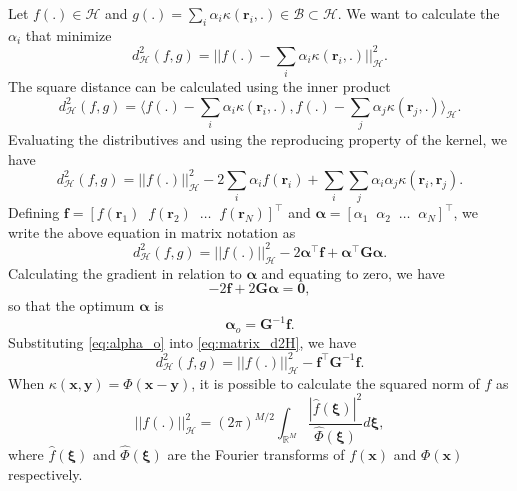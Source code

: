 Let $f(.) \in \mathcal{H}$ and $g(.) = \sum_{i}\alpha_i \kappa(\mathbf{r}_i,.) \in \mathcal{B} \subset \mathcal{H}$. We want to calculate the $\alpha_i$ that minimize
\begin{equation}
    d^2_\mathcal{H}(f,g) = ||f(.) - \sum_{i}\alpha_i \kappa(\mathbf{r}_i,.)||^2_{\mathcal{H}}.
\end{equation}
The square distance can be calculated using the inner product
\begin{equation}
    d^2_\mathcal{H}(f,g) = \langle f(.) - \sum_{i}\alpha_i \kappa(\mathbf{r}_i,.), f(.) - \sum_{j}\alpha_j \kappa(\mathbf{r}_j,.) \rangle_{\mathcal{H}}.
\end{equation}
Evaluating the distributives and using the reproducing property of the kernel, we have
\begin{equation}
    d^2_\mathcal{H}(f,g) = ||f(.)||^2_\mathcal{H} - 2\sum_{i}\alpha_i f(\mathbf{r}_i)   +\sum_i\sum_{j}\alpha_i\alpha_j \kappa(\mathbf{r}_i,\mathbf{r}_j).
\end{equation}
Defining $\mathbf{f} = \left[ f(\mathbf{r}_1) \;\; f(\mathbf{r}_2) \;\; \dots \;\; f(\mathbf{r}_N) \right]^\top$ and $\boldsymbol{\alpha} = \left[\alpha_1 \;\;\alpha_2 \;\;\dots \;\;\alpha_N\right]^\top$, we write the above equation in matrix notation as
\begin{equation}
    d^2_\mathcal{H}(f,g) = ||f(.)||^2_\mathcal{H} -2\boldsymbol{\alpha}^\top \mathbf{f} + \boldsymbol{\alpha}^\top\mathbf{G}\boldsymbol{\alpha}.\label{eq:matrix_d2H}
\end{equation}
Calculating the gradient in relation to $\boldsymbol{\alpha}$ and equating to zero, we have
\begin{equation}
    -2\mathbf{f} + 2\mathbf{G}\boldsymbol{\alpha} = \mathbf{0},
\end{equation}
so that the optimum $\boldsymbol{\alpha}$ is
\begin{equation}
    \boldsymbol{\alpha}_o = \mathbf{G}^{-1}\mathbf{f}.\label{eq:alpha_o}
\end{equation}
Substituting \eqref{eq:alpha_o} into \eqref{eq:matrix_d2H}, we have
\begin{equation}
    d^2_\mathcal{H}(f,g) = ||f(.)||^2_\mathcal{H} -\mathbf{f}^\top\mathbf{G}^{-1}\mathbf{f}.
\end{equation}
When $\kappa(\mathbf{x},\mathbf{y}) = \Phi(\mathbf{x} - \mathbf{y})$, it is possible to calculate the squared norm of $f$ as \cite{wendland_scattered_2005}
\begin{equation}
    ||f(.)||_\mathcal{H}^2 = (2\pi)^{M/2}\int_{\mathbb{R}^{M}}\frac{|\hat{f}(\boldsymbol{\xi})|^2}{\hat{\Phi}(\boldsymbol{\xi})}d\boldsymbol{\xi},
\end{equation} 
where $\hat{f}(\boldsymbol{\xi})$ and $\hat{\Phi}(\boldsymbol{\xi})$ are the Fourier transforms of $f(\mathbf{x})$ and $\Phi(\mathbf{x})$ respectively.

